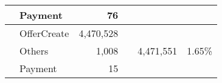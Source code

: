 \begin{table}[ht]
\begin{tabular}{llrrrr}
		                                                                 & Payment       & 76               &  &                                                           &                            \\
		\midrule
		\multirow{3}[0]{*}{\xrpaddr{rwchA2b36zu2r6CJfEMzPLQ1cmciKFcw9t}} & OfferCreate   & 4,470,528        &  & \multirow{3}[0]{*}{        4,471,551}                     & \multirow{3}[0]{*}{1.65\%} \\
		                                                                 & Others        & 1,008            &  &                                                           &                            \\
		                                                                 & Payment       & 15               &  &                                                           &                            \\
		\bottomrule
	\end{tabular}%
\end{table}
